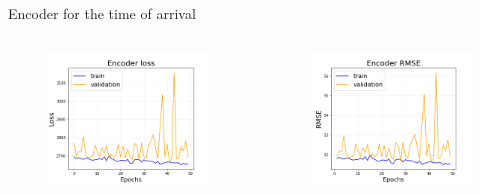 \documentclass{beamer}
\begin{document}
\begin{frame}{Encoder for the time of arrival}
    \begin{columns}
        \begin{figure}
            \centering
            \includegraphics[width=\textwidth]{figures/enc_loss.png}
        \end{figure}
        
        \begin{figure}
            \centering
            \includegraphics[width=\textwidth]{figures/enc_rmse.png}
        \end{figure}
        \end{columns}
\end{frame}
\end{document}
